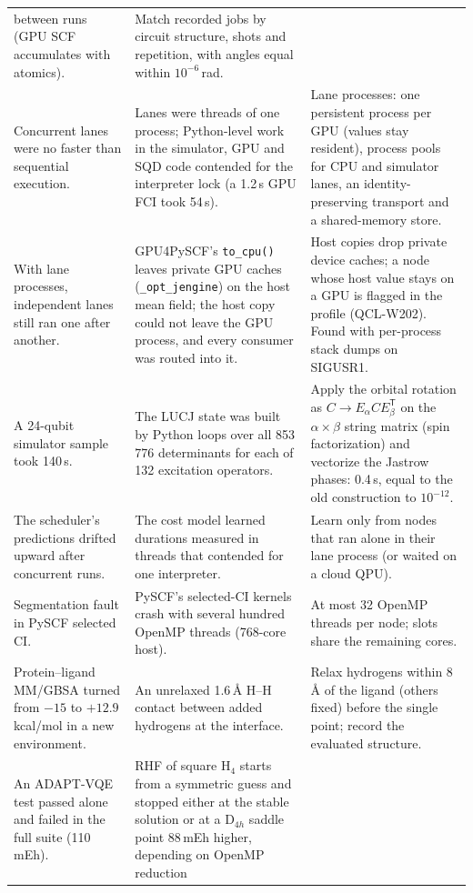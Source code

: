 \documentclass[10pt]{article}
\newcommand{\code}[1]{\texttt{#1}}
\begin{document}
\begin{table}[p]
\begin{tabular}{>{\raggedright\arraybackslash}p{}>{\raggedright\arraybackslash}p{}>{\raggedright\arraybackslash}p{}}
between runs (GPU SCF accumulates with atomics). &
Match recorded jobs by circuit structure, shots and repetition, with angles equal within
$10^{-6}$\,rad. \\
Concurrent lanes were no faster than sequential execution. &
Lanes were threads of one process; Python-level work in the simulator, GPU and SQD code
contended for the interpreter lock (a 1.2\,s GPU FCI took 54\,s). &
Lane processes: one persistent process per GPU (values stay resident), process pools for
CPU and simulator lanes, an identity-preserving transport and a shared-memory store. \\
With lane processes, independent lanes still ran one after another. &
GPU4PySCF's \code{to\_cpu()} leaves private GPU caches (\code{\_opt\_jengine}) on the
host mean field; the host copy could not leave the GPU process, and every consumer was
routed into it. &
Host copies drop private device caches; a node whose host value stays on a GPU is
flagged in the profile (QCL-W202). Found with per-process stack dumps on SIGUSR1. \\
A 24-qubit simulator sample took 140\,s. &
The LUCJ state was built by Python loops over all 853\,776 determinants for each of 132
excitation operators. &
Apply the orbital rotation as $C \to E_\alpha C E_\beta^{\mathsf T}$ on the
$\alpha\times\beta$ string matrix (spin factorization) and vectorize the Jastrow phases:
0.4\,s, equal to the old construction to $10^{-12}$. \\
The scheduler's predictions drifted upward after concurrent runs. &
The cost model learned durations measured in threads that contended for one interpreter. &
Learn only from nodes that ran alone in their lane process (or waited on a cloud QPU). \\
Segmentation fault in PySCF selected CI. &
PySCF's selected-CI kernels crash with several hundred OpenMP threads (768-core host). &
At most 32 OpenMP threads per node; slots share the remaining cores. \\
Protein--ligand MM/GBSA turned from $-15$ to $+12.9$\,kcal/mol in a new environment. &
An unrelaxed 1.6\,\AA{} H--H contact between added hydrogens at the interface. &
Relax hydrogens within 8\,\AA{} of the ligand (others fixed) before the single point;
record the evaluated structure. \\
An ADAPT-VQE test passed alone and failed in the full suite (110\,mEh). &
RHF of square H$_4$ starts from a symmetric guess and stopped either at the stable
solution or at a D$_{4h}$ saddle point 88\,mEh higher, depending on OpenMP reduction

\end{tabular}
\end{table}
\end{document}

